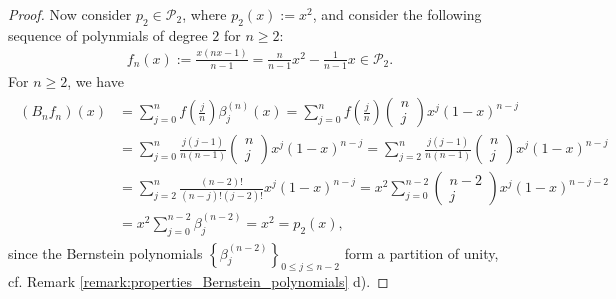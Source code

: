 \begin{proof}
	Now consider $p_2\in\mathcal P_2$, where $p_2(x) := x^2$, and consider the following sequence of polynmials of degree $2$ for $n\geq 2$:
	\begin{align}
		f_n(x) := \frac{x(nx-1)}{n-1} = \frac{n}{n-1}x^2 - \frac{1}{n-1}x\in\mathcal P_2.
	\end{align}
	For $n\geq 2$, we have
	\begin{align}\label{eq:bernstein_operator_seq}
		\begin{split}
			\left(B_nf_n\right)(x) &= \sum_{j=0}^{n}f\left(\frac{j}{n}\right)\beta_j^{(n)}(x) = \sum_{j=0}^{n}f\left(\frac{j}{n}\right)\begin{pmatrix}n\\ j\end{pmatrix}x^j(1-x)^{n-j}
			\\[4pt] &= \sum_{j=0}^{n}\frac{j(j-1)}{n(n-1)}\begin{pmatrix}n\\ j\end{pmatrix}x^j(1-x)^{n-j} = \sum_{j=2}^{n}\frac{j(j-1)}{n(n-1)}\begin{pmatrix}n\\ j\end{pmatrix}x^j(1-x)^{n-j}
			\\[4pt] &= \sum_{j=2}^{n}\frac{(n-2)!}{(n-j)!(j-2)!}x^j(1-x)^{n-j} = x^2\sum_{j=0}^{n-2}\begin{pmatrix}n - 2\\ j\end{pmatrix}x^j(1-x)^{n-j-2}
			\\[4pt] &= x^2\sum_{j=0}^{n-2}\beta_j^{(n-2)} = x^2 = p_2(x),
		\end{split}
	\end{align}
	since the Bernstein polynomials $\left\{\beta_j^{(n-2)}\right\}_{0\leq j\leq n-2}$ form a partition of unity, cf. Remark \ref{remark:properties_Bernstein_polynomials} d).
	

\end{proof}
